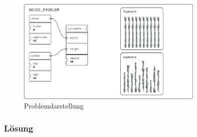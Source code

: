 \documentclass[ngerman]{article}
\begin{document}
\begin{figure}[htbp]
  \centering
  \includegraphics[width=0.8\textwidth]{./graphics/NOISE_PROBLEM.pdf}
  \caption{Problemdarstellung}
  \label{fig:noise_problem}
\end{figure}

\subsubsection*{Lösung}
\end{document}
